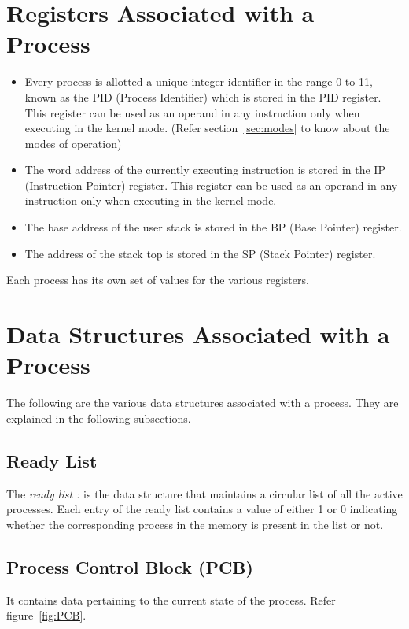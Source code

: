 \section{Registers Associated with a Process}
\label{register details}
\begin{itemize}
	\item Every process is allotted a unique integer identifier in the range 0 to 11, known as the PID (Process Identifier) which is stored in the PID register. This register can be used as an operand in any instruction only when executing in the kernel mode. (Refer section~\ref{sec:modes} to know about the modes of operation)
	\item The word address of the currently executing instruction is stored in the IP (Instruction Pointer) register. This register can be used as an operand in any instruction only when executing in the kernel mode.
	\item The base address of the user stack is stored in the BP (Base Pointer) register. 
	\item The address of the stack top is stored in the SP (Stack Pointer) register. 
\end{itemize}
Each process has its own set of values for the various registers.

\section{Data Structures Associated with a Process}

The following are the various data structures associated with a process. They are explained in the following subsections.

\subsection{Ready List}
\label{lbl:rdylst}
The \textit{ready list :} is the data structure that maintains a circular list of all the active processes. Each entry of the ready list contains a value of either 1 or 0 indicating whether the corresponding process in the memory is present in the list or not.

\subsection{Process Control Block (PCB)}
\label{sec:pcb}
It contains data pertaining to the current state of the process. Refer figure~\ref{fig:PCB}.\\

